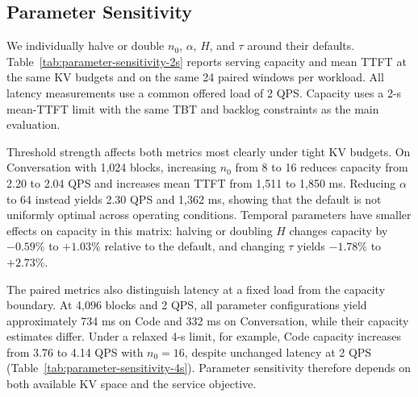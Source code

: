 \subsection{Parameter Sensitivity}
\label{sec:parameter-sensitivity}

We individually halve or double $n_0$, $\alpha$, $H$, and $\tau$
around their defaults. Table~\ref{tab:parameter-sensitivity-2s}
reports serving capacity and mean TTFT at the same KV budgets and
on the same 24 paired windows per workload. All latency measurements
use a common offered load of 2 QPS. Capacity uses a 2-s mean-TTFT
limit with the same TBT and backlog constraints as the main evaluation.

Threshold strength affects both metrics most clearly under tight KV
budgets. On Conversation with 1,024 blocks, increasing $n_0$ from
8 to 16 reduces capacity from 2.20 to 2.04 QPS and increases mean
TTFT from 1,511 to 1,850 ms. Reducing $\alpha$ to 64 instead yields
2.30 QPS and 1,362 ms, showing that the default is not uniformly
optimal across operating conditions. Temporal parameters have
smaller effects on capacity in this matrix: halving or doubling $H$
changes capacity by $-0.59$\% to $+1.03$\% relative to the default,
and changing $\tau$ yields $-1.78$\% to $+2.73$\%.

The paired metrics also distinguish latency at a fixed load from
the capacity boundary. At 4,096 blocks and 2 QPS, all parameter
configurations yield approximately 734 ms on Code and 332 ms on
Conversation, while their capacity estimates differ. Under a relaxed
4-s limit, for example, Code capacity increases from 3.76 to 4.14 QPS
with $n_0=16$, despite unchanged latency at 2 QPS
(Table~\ref{tab:parameter-sensitivity-4s}). Parameter sensitivity
therefore depends on both available KV space and the service objective.
